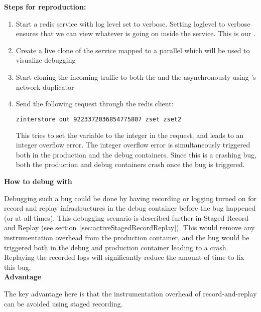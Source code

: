 \noindent \textbf{Steps for reproduction:}\\

\begin{adjustwidth}{0.5cm}{}
\begin{enumerate}
	\item Start a redis service with log level set to verbose. Setting loglevel to verbose ensures that we can view whatever is going on inside the service. This is our \productioncontainer.
	\item Create a live clone of the service mapped to a parallel \debugcontainer which will be used to visualize debugging
	\item Start cloning the incoming traffic to both the \productioncontainer and the \debugcontainer asynchronously using \parikshan's network duplicator
	\item Send the following request through the redis client: 
	
		\begin{lstlisting}[language=sh]
		zinterstore out 9223372036854775807 zset zset2
		\end{lstlisting}
		
		This tries to set the variable to the integer in the request, and leads to an integer overflow error. The integer overflow error is simultaneously triggered both in the production and the debug containers. Since this is a crashing bug, both the production and debug containers crash once the bug is triggered. 
					
\end{enumerate}
\end{adjustwidth}

\noindent \textbf{How to debug with \parikshan}

Debugging such a bug could be done by having recording or logging turned on for record and replay infrastructures in the debug container before the bug happened (or at all times). This debugging scenario is described further in Staged Record and Replay (see section~\ref{sec:activeStagedRecordReplay}). This would remove any instrumentation overhead from the production container, and the bug would be triggered both in the debug and production container leading to a crash. Replaying the recorded logs will significantly reduce the amount of time to fix this bug.\\ 

\noindent \textbf{Advantage}

The key advantage here is that the instrumentation overhead of record-and-replay can be avoided using staged recording.\\

